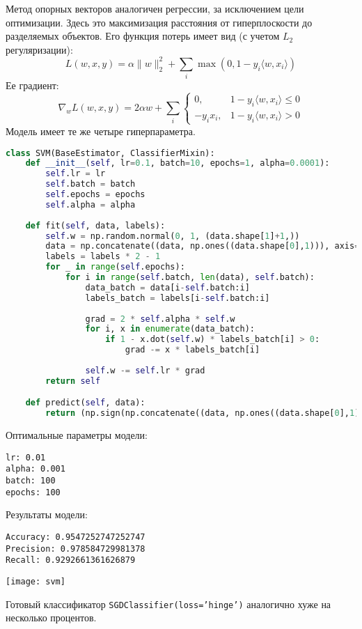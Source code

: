 Метод опорных векторов аналогичен регрессии, за исключением цели оптимизации. Здесь это максимизация расстояния от гиперплоскости до разделяемых объектов. Его функция потерь имеет вид (с учетом $L_2$ регуляризации):
$$L(w, x, y) = \alpha\|w\|^2_2 + \sum_i \max(0, 1-y_i \langle w, x_i\rangle)$$
Ее градиент:
\begin{equation*}
\nabla_w L(w, x, y) = 2 \alpha w + \sum_i
\begin{cases} 
    0,           & 1 - y_i \langle w, x_i \rangle \leq 0 \\
    - y_i x_i,   & 1 - y_i \langle w, x_i \rangle > 0
\end{cases}
\end{equation*}
Модель имеет те же четыре гиперпараметра.

\begin{lstlisting}[language=python, keepspaces=true]
class SVM(BaseEstimator, ClassifierMixin):
    def __init__(self, lr=0.1, batch=10, epochs=1, alpha=0.0001):
        self.lr = lr
        self.batch = batch
        self.epochs = epochs
        self.alpha = alpha
    
    def fit(self, data, labels):
        self.w = np.random.normal(0, 1, (data.shape[1]+1,))
        data = np.concatenate((data, np.ones((data.shape[0],1))), axis=1)
        labels = labels * 2 - 1
        for _ in range(self.epochs):
            for i in range(self.batch, len(data), self.batch):
                data_batch = data[i-self.batch:i]
                labels_batch = labels[i-self.batch:i]
                
                grad = 2 * self.alpha * self.w
                for i, x in enumerate(data_batch):
                    if 1 - x.dot(self.w) * labels_batch[i] > 0:
                        grad -= x * labels_batch[i]
                
                self.w -= self.lr * grad
        return self

    def predict(self, data):
        return (np.sign(np.concatenate((data, np.ones((data.shape[0],1))), axis=1).dot(self.w)) + 1) / 2
\end{lstlisting}

Оптимальные параметры модели:

\begin{lstlisting}[frame=none, numbers=none]
lr: 0.01
alpha: 0.001
batch: 100
epochs: 100
\end{lstlisting}

Результаты модели:

\begin{lstlisting}[frame=none, numbers=none]
Accuracy: 0.9547252747252747
Precision: 0.978584729981378
Recall: 0.9292661361626879
\end{lstlisting}
\texttt{[image: svm]}

Готовый классификатор {\tt SGDClassifier(loss='hinge')} аналогично хуже на несколько процентов.

\pagebreak

